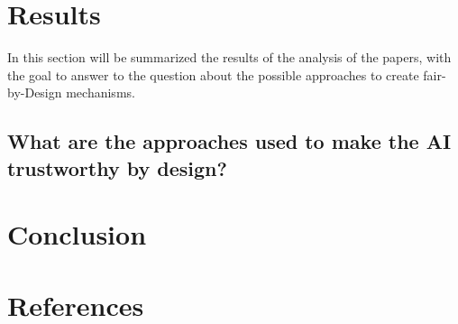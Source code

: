 \documentclass{article}
\begin{document}
\newpage
\section{Results}
In this section will be summarized the results of the analysis of the papers, with the goal to answer to the question about the possible approaches to create fair-by-Design mechanisms.

\subsection{What are the approaches used to make the AI trustworthy by design?}


\newpage
\section{Conclusion}

\newpage
\section{References}
\end{document}
